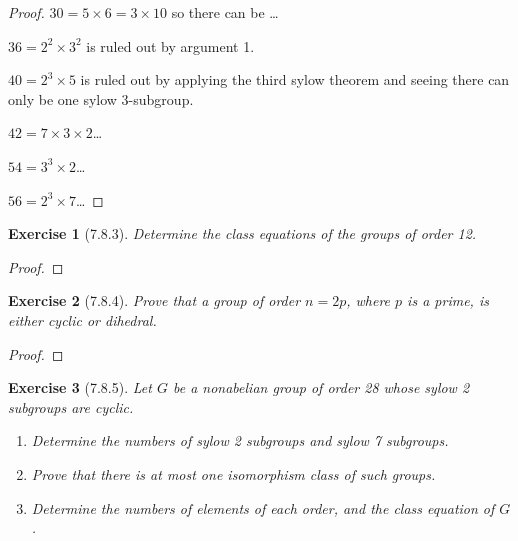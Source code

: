 \documentclass[12pt]{article}
\newtheorem*{exer}{Exercise}
\begin{document}
\begin{proof}
     $30 = 5 \times 6 = 3 \times 10$ so there can be \dots

     $36 = 2^2 \times 3^2$ is ruled out by argument 1.

     $40 = 2^3 \times 5$ is ruled out by applying the third sylow
     theorem and seeing there can only be one sylow 3-subgroup.

     $42 = 7 \times 3 \times 2$\dots

     $54 = 3^3 \times 2$\dots

     $56 = 2^3 \times 7$\dots

\end{proof}


\begin{exer}[7.8.3]

    Determine the class equations of the groups of order 12.

\end{exer}

\begin{proof}

\end{proof}


\begin{exer}[7.8.4]

    Prove that a group of order $n = 2p$, where $p$ is a prime, is
    either cyclic or dihedral.

\end{exer}

\begin{proof}

\end{proof}


\begin{exer}[7.8.5]

    Let $G$ be a nonabelian group of order 28 whose sylow 2 subgroups
    are cyclic.

    \begin{enumerate}
        \item Determine the numbers of sylow 2 subgroups and sylow 7
            subgroups.

        \item Prove that there is at most one isomorphism class of such
            groups.

        \item Determine the numbers of elements of each order, and the
            class equation of $G$.
    \end{enumerate}

\end{exer}
\end{document}
